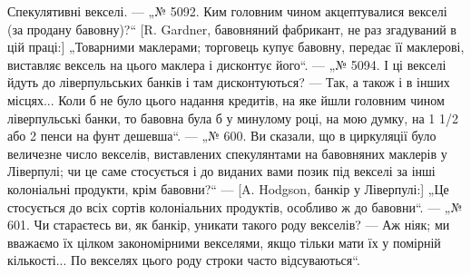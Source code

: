 Спекулятивні векселі. — „№ 5092. Ким головним чином акцептувалися векселі (за продану бавовну)?“ [R.
Gardner, бавовняний фабрикант, не раз згадуваний в цій праці:] „Товарними маклерами; торговець купує
бавовну,
передає її маклерові, виставляє вексель на цього маклера і дисконтує його“. — „№ 5094. І ці векселі
йдуть до ліверпульських банків і там дисконтуються? — Так, а також і в інших місцях... Коли б не
було цього надання кредитів, на яке
йшли головним чином ліверпульські банки, то бавовна була б у минулому році,
на мою думку, на 1 1/2 або 2 пенси на фунт дешевша“. — „№ 600. Ви сказали,
що в циркуляції було величезне число векселів, виставлених спекулянтами на
бавовняних маклерів у Ліверпулі; чи це саме стосується і до виданих вами
позик під векселі за інші колоніальні продукти, крім бавовни?“ — [A. Hodgson,
банкір у Ліверпулі:] „Це стосується до всіх сортів колоніальних продуктів,
особливо ж до бавовни“. — „№ 601. Чи стараєтесь ви, як банкір, уникати
такого роду векселів? — Аж ніяк; ми вважаємо їх цілком закономірними векселями, якщо тільки мати їх
у помірній кількості... По векселях цього роду
строки часто відсуваються“.

